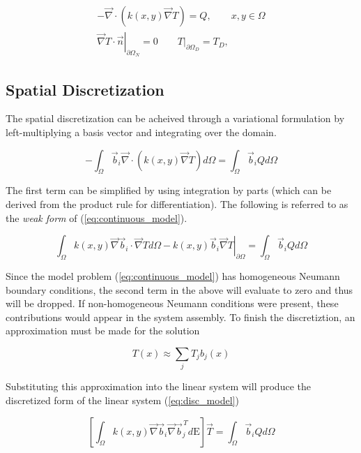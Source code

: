 \documentclass[11pt]{style/memo}
\begin{document}
\begin{equation}
    \label{eq:continuous_model}
    \begin{gathered}
        -\vec{\nabla}\cdot\left(k(x,y) \vec{\nabla} T \right) = Q, \qquad x,y \in \Omega \\
        \left. \vec{\nabla}T\cdot\vec{n} \right|_{\partial\Omega_N} = 0 \qquad \left. T \right|_{\partial\Omega_D} = T_D,
    \end{gathered}
\end{equation}

\subsection{Spatial Discretization}
The spatial discretization can be acheived through a variational formulation
by left-multiplying a basis vector and integrating over the domain.

\begin{equation*}
    -\int_\Omega \vec{b}_i \vec{\nabla}\cdot\left(k(x,y) \vec{\nabla} T \right)d\Omega = \int_\Omega \vec{b}_i Q d\Omega
\end{equation*}

The first term can be simplified by  using integration by parts (which can be derived from the
product rule for differentiation). The following is referred to as the \emph{weak form} of
(\ref{eq:continuous_model}).

\begin{equation*}
    \int_\Omega k(x,y) \vec{\nabla}\vec{b}_i \cdot \vec{\nabla} T d\Omega - \left. k(x,y)\vec{b}_i\vec{\nabla}T \right|_{\partial\Omega} = \int_\Omega \vec{b}_i Q d\Omega
\end{equation*}

Since the model problem (\ref{eq:continuous_model}) has homogeneous Neumann boundary conditions, the
second term in the above will evaluate to zero and thus will be dropped. If non-homogeneous Neumann
conditions were present, these contributions would appear in the system assembly. To finish the
discretiztion, an approximation must be made for the solution

\begin{equation*}
    T(x) \approx \sum_j T_j b_j(x)
\end{equation*}

Substituting this approximation into the linear system will produce the discretized form of the
linear system (\ref{eq:disc_model})

\begin{equation}
    \label{eq:disc_model}
    \left[ \int_\Omega k(x,y) \vec{\nabla}\vec{b}_i \vec{\nabla}\vec{b}_j^{\,T} d\mathrm{E} \right] \vec{T} = \int_\Omega \vec{b}_i Q d\Omega
\end{equation}
\end{document}

